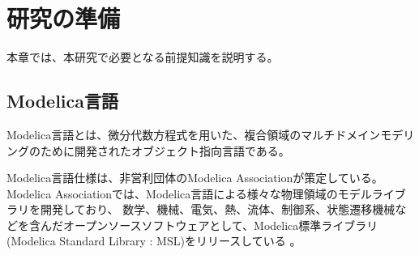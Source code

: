 \chapter{研究の準備}\label{cha:Preparation}
  \vspace{-2zh}
本章では、本研究で必要となる前提知識を説明する。
  \vspace{-1zh}
\section{Modelica言語}\label{modelica}
Modelica言語とは、微分代数方程式を用いた、複合領域のマルチドメインモデリングのために開発されたオブジェクト指向言語である\cite{modelicaモデルベース本}。

Modelica言語仕様は、非営利団体のModelica Associationが策定している。
Modelica Associationでは、Modelica言語による様々な物理領域のモデルライブラリを開発しており、
数学、機械、電気、熱、流体、制御系、状態遷移機械などを含んだオープンソースソフトウェアとして、Modelica標準ライブラリ(Modelica Standard Library : MSL)をリリースしている
\cite{modelicaモデルベース本}。
  \vspace{-1zh}
